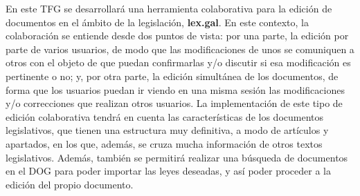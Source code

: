 En este TFG se desarrollará una herramienta colaborativa para la edición de documentos en el ámbito de la legislación, {\bf lex.gal}. En este contexto, la colaboración se entiende desde dos puntos de vista: por una parte, la edición por parte de varios usuarios, de modo que las modificaciones de unos se comuniquen a otros con el objeto de que puedan confirmarlas y/o discutir si esa modificación es pertinente o no; y, por otra parte, la edición simultánea de los documentos, de forma que los usuarios puedan ir viendo en una misma sesión las modificaciones y/o correcciones que realizan otros usuarios. La implementación de este tipo de edición colaborativa tendrá en cuenta las características de los documentos legislativos, que tienen una estructura muy definitiva, a modo de artículos y apartados, en los que, además, se cruza mucha información de otros textos legislativos. Además, también se permitirá realizar una búsqueda de documentos en el DOG para poder importar las leyes deseadas, y así poder proceder a la edición del propio documento.